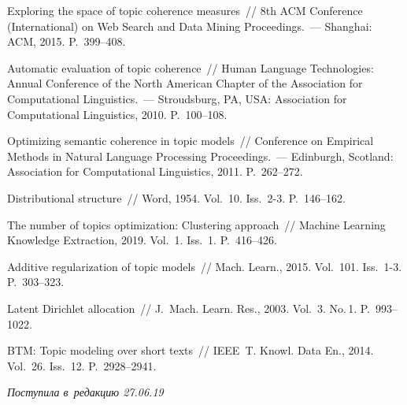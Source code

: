 \begin{multicols}{2}
{{\begin{thebibliography}{99}
Exploring the space of topic coherence measures~// 8th ACM 
 Conference (International) on Web Search and Data Mining Proceedings.~--- 
Shanghai: ACM, 2015.  P.~399--408.

Automatic evaluation of topic coherence~// Human 
Language Technologies:  
Annual Conference of the North American Chapter of the Association for 
Computational Linguistics.~--- Stroudsburg, PA, USA: Association for Computational 
Linguistics, 2010. P.~100--108.

Optimizing semantic coherence in topic models~// Conference 
on Empirical Methods in Natural Language Processing
Proceedings.~--- Edinburgh, Scotland: 
Association for Computational Linguistics, 2011. P.~262--272.

  Distributional 
structure~// Word, 1954. Vol.~10. Iss.~2-3. P.~146--162.

 The number of topics 
optimization: Clustering approach~// Machine Learning Knowledge Extraction, 
2019. Vol.~1. Iss.~1. P.~416--426.

 Additive 
regularization of topic models~// Mach. Learn., 2015. Vol.~101. Iss.~1-3. 
P.~303--323.

Latent Dirichlet allocation~// J.~Mach. Learn. Res., 2003. 
Vol.~3. No.\,1. P.~993--1022.

 BTM: Topic 
modeling over short texts~// IEEE~T. Knowl. Data 
En., 2014. Vol.~26. Iss.~12. P.~2928--2941.
\end{thebibliography}

 }
 }

\end{multicols}

\vspace*{-3pt}

\hfill{\small\textit{Поступила в~редакцию 27.06.19}}

\vspace*{10pt}



